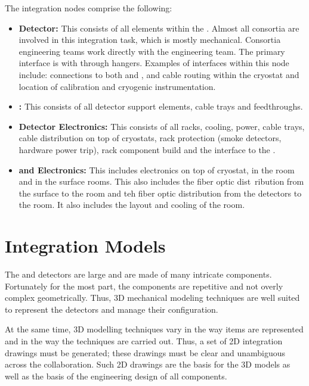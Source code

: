 The integration nodes comprise the following:
\begin{itemize}
\item {\bf Detector:} This consists of all  elements within
  the . Almost all consortia are involved in this
  integration task, which is mostly mechanical. Consortia engineering
  teams work directly with the  engineering team.  The
  primary interface is with  through hangers. Examples of
  interfaces within this node include:  connections to both
   and ,  and  cable
  routing within the cryostat and location of calibration and
  cryogenic instrumentation.
\item {\bf {}:} This consists of all detector support elements,
  cable trays and feedthroughs.
\item {\bf Detector Electronics:} This consists of all racks, cooling, power, cable
  trays, cable distribution on top of cryostats, rack protection
  (smoke detectors, hardware power trip), rack component build and the interface to
  the .
\item {\bf {} and Electronics:} This includes electronics on top of cryostat,
  in the  room and in the surface rooms. This also includes the  fiber optic dist\
  ribution from
  the surface to the  room and teh fiber optic distribution from the
  detectors to the  room. It also includes the layout and cooling of the \dword{daq}
  room.
\end{itemize}



\section{Integration Models}
\label{sec:fdsp-coord-integ-models}

The  and  detectors are large and are made of many
intricate components. Fortunately for the most part, the
components are repetitive and not overly complex
geometrically. Thus, 3D mechanical modeling techniques are well suited
to represent the detectors and manage their configuration.

At the same time, 3D modelling techniques vary in the way items are
represented and in the way the techniques are carried out. Thus, a set
of 2D integration drawings must be generated; these drawings must be
clear and unambiguous across the collaboration. Such 2D drawings are
the basis for the 3D models as well as the basis of the engineering
design of all components.


